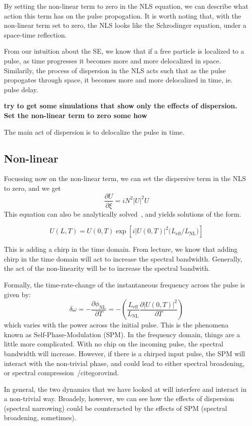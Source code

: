 \documentclass[12pt, titlepage]{article}
\renewcommand{\pd}[2]{\frac{\partial #1}{\partial #2}}
\begin{document}
\begin{spacing}{1.1}
By setting the non-linear term to zero in the NLS equation, we can describe what action this term has on the pulse propogation. It is worth noting that, with the non-linear term set to zero, the NLS looks like the Schrodinger equation, under a space-time reflection.

From our intuition about the SE, we know that if a free particle is localized to a pulse, as time progresses it becomes more and more delocalized in space. Similarily, the process of dispersion in the NLS acts such that as the pulse propogates through space, it becomes more and more delocalized in time, ie. pulse delay.

\textbf{try to get some simulations that show only the effects of dispersion. Set the non-linear term to zero some how}

The main act of dispersion is to delocalize the pulse in time.
\subsection{Non-linear}
Focussing now on the non-linear term, we can set the dispersive term in the NLS to zero, and we get 
\[
\pd{U}{\xi}= i N^2 |U|^2U 
\]
This equation can also be analytically solved~\cite{gorovind}, and yields solutions of the form.

\[
U(L,T) = U(0,T)\exp\left[{i\left|U(0,T)\right|^2(L_\text{eff}/L_\text{NL}})\right]
\]

This is adding a chirp in the time domain. From lecture, we know that adding chirp in the time domain will act to increase the spectral bandwidth. Generally, the act of the non-linearity will be to increase the spectral bandwith.

Formally, the time-rate-change of the instantaneous frequency across the pulse is given by:
\[
\delta \omega = -\pd{\phi_\text{NL}}{T} = -\left(\frac{L_\text{eff}}{L_\text{NL}} \pd{|U(0,T)|^2}{T}\right)
\]
which varies with the power across the initial pulse.
This is the phenomena known as Self-Phase-Modulation (SPM).
In the frequency domain, things are a little more complicated. With no chip on the incoming pulse, the spectral bandwidth will increase. However, if there is a chirped input pulse, the SPM will
interact with the non-trivial phase, and could lead to either spectral broadening, or spectral compression~/cite{gorovind}.

In general, the two dynamics that we have looked at will interfere and interact in a non-trivial way. Broadely, however, we can see how the effects of dispersion (spectral narrowing) could be counteracted by the effects of SPM (spectral broadening, sometimes).


\end{spacing}
\end{document}
